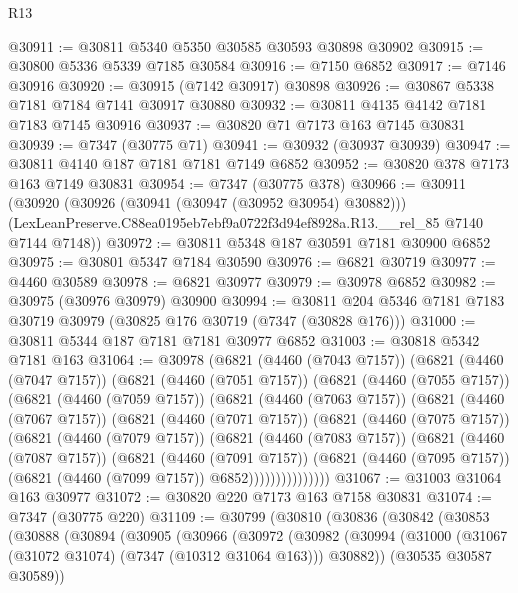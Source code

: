 \begin{lexlean}{R13}
\begin{coremodule}
@30911 := @30811 @5340 @5350 @30585 @30593 @30898 @30902
@30915 := @30800 @5336 @5339 @7185 @30584
@30916 := @7150 @6852
@30917 := @7146 @30916
@30920 := @30915 (@7142 @30917) @30898
@30926 := @30867 @5338 @7181 @7184 @7141 @30917 @30880
@30932 := @30811 @4135 @4142 @7181 @7183 @7145 @30916
@30937 := @30820 @71 @7173 @163 @7145 @30831
@30939 := @7347 (@30775 @71)
@30941 := @30932 (@30937 @30939)
@30947 := @30811 @4140 @187 @7181 @7181 @7149 @6852
@30952 := @30820 @378 @7173 @163 @7149 @30831
@30954 := @7347 (@30775 @378)
@30966 := @30911
    (@30920
      (@30926 (@30941 (@30947 (@30952 @30954) @30882)))
      (LexLeanPreserve.C88ea0195eb7ebf9a0722f3d94ef8928a.R13.__rel_85 @7140 @7144 @7148))
@30972 := @30811 @5348 @187 @30591 @7181 @30900 @6852
@30975 := @30801 @5347 @7184 @30590
@30976 := @6821 @30719
@30977 := @4460 @30589
@30978 := @6821 @30977
@30979 := @30978 @6852
@30982 := @30975 (@30976 @30979) @30900
@30994 := @30811 @204 @5346 @7181 @7183 @30719 @30979 (@30825 @176 @30719 (@7347 (@30828 @176)))
@31000 := @30811 @5344 @187 @7181 @7181 @30977 @6852
@31003 := @30818 @5342 @7181 @163
@31064 := @30978
    (@6821
      (@4460 (@7043 @7157))
      (@6821
        (@4460 (@7047 @7157))
        (@6821
          (@4460 (@7051 @7157))
          (@6821
            (@4460 (@7055 @7157))
            (@6821
              (@4460 (@7059 @7157))
              (@6821
                (@4460 (@7063 @7157))
                (@6821
                  (@4460 (@7067 @7157))
                  (@6821
                    (@4460 (@7071 @7157))
                    (@6821
                      (@4460 (@7075 @7157))
                      (@6821
                        (@4460 (@7079 @7157))
                        (@6821
                          (@4460 (@7083 @7157))
                          (@6821
                            (@4460 (@7087 @7157))
                            (@6821
                              (@4460 (@7091 @7157))
                              (@6821
                                (@4460 (@7095 @7157))
                                (@6821 (@4460 (@7099 @7157)) @6852)))))))))))))))
@31067 := @31003 @31064 @163 @30977
@31072 := @30820 @220 @7173 @163 @7158 @30831
@31074 := @7347 (@30775 @220)
@31109 := @30799
    (@30810
      (@30836
        (@30842
          (@30853
            (@30888
              (@30894
                (@30905
                  (@30966
                    (@30972
                      (@30982
                        (@30994
                          (@31000 (@31067 (@31072 @31074) (@7347 (@10312 @31064 @163))) @30882))
                        (@30535 @30587 @30589))

\end{coremodule}
\end{lexlean}

